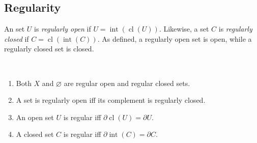 \documentclass{treatise}
\begin{document}
\subsection{Regularity}
An set $U$ is \emph{regularly open} if $U = \operatorname{int}(\operatorname{cl}(U))$. Likewise, a set $C$ is \emph{regularly closed} if $C = \operatorname{cl}(\operatorname{int}(C))$. As defined, a regularly open set is open, while a regularly closed set is closed.
\begin{proposition} \ 
\begin{enumerate}
    \item Both $X$ and $\varnothing$ are regular open and regular closed sets.
    \item A set is regularly open iff its complement is regularly closed.
    \item An open set $U$ is regular iff $\partial \operatorname{cl}(U) = \partial U$.
    \item A closed set $C$ is regular iff $\partial \operatorname{int}(C) = \partial C$.
\end{enumerate}
\end{proposition}
\end{document}
